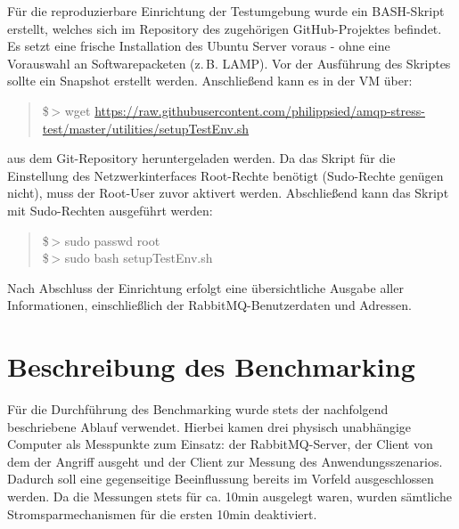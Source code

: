 \documentclass[	a4paper,
			11pt,
			oneside,
			parskip]{scrartcl}
\begin{document}
	Für die reproduzierbare Einrichtung der Testumgebung wurde ein BASH-Skript erstellt, welches sich im Repository des zugehörigen GitHub-Projektes befindet. Es setzt eine frische Installation 
	des Ubuntu Server voraus - ohne eine Vorauswahl an Softwarepacketen (z.\,B. LAMP). Vor der Ausführung des Skriptes sollte ein Snapshot erstellt werden. Anschließend kann es in der VM über:
	\begin{quote}
		\ttfamily 		
		\$\,> wget \url{https://raw.githubusercontent.com/philippsied/amqp-stress-test/master/utilities/setupTestEnv.sh}
	\end{quote}
	aus dem Git-Repository heruntergeladen werden. Da das Skript für die Einstellung des Netzwerkinterfaces Root-Rechte benötigt (Sudo-Rechte genügen nicht), muss der Root-User zuvor aktivert werden.
	Abschließend kann das Skript mit Sudo-Rechten ausgeführt werden:
	\begin{quote}
		\ttfamily 
		\$\,> sudo passwd root\\
		\$\,> sudo bash setupTestEnv.sh
	\end{quote}
	
	Nach Abschluss der Einrichtung erfolgt eine übersichtliche Ausgabe aller Informationen, einschließlich der RabbitMQ-Benutzerdaten und Adressen.

	



%	
%
\clearpage
\section*{Beschreibung des Benchmarking}
	
	Für die Durchführung des Benchmarking wurde stets der nachfolgend beschriebene Ablauf verwendet. Hierbei kamen drei physisch unabhängige Computer als Messpunkte zum Einsatz: der RabbitMQ-Server,
	der Client von dem der Angriff ausgeht und der Client zur Messung des Anwendungsszenarios. Dadurch soll eine gegenseitige Beeinflussung bereits im Vorfeld ausgeschlossen werden. Da die Messungen
	stets für ca. 10min ausgelegt waren, wurden sämtliche Stromsparmechanismen für die ersten 10min deaktiviert.
	
\end{document}
